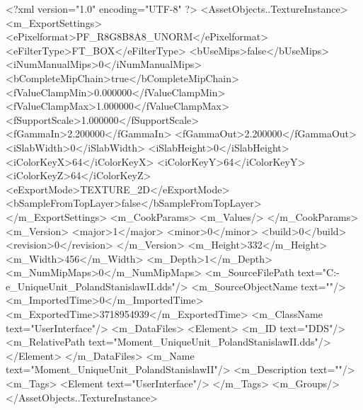 <?xml version="1.0" encoding="UTF-8" ?>
<AssetObjects..TextureInstance>
	<m_ExportSettings>
		<ePixelformat>PF_R8G8B8A8_UNORM</ePixelformat>
		<eFilterType>FT_BOX</eFilterType>
		<bUseMips>false</bUseMips>
		<iNumManualMips>0</iNumManualMips>
		<bCompleteMipChain>true</bCompleteMipChain>
		<fValueClampMin>0.000000</fValueClampMin>
		<fValueClampMax>1.000000</fValueClampMax>
		<fSupportScale>1.000000</fSupportScale>
		<fGammaIn>2.200000</fGammaIn>
		<fGammaOut>2.200000</fGammaOut>
		<iSlabWidth>0</iSlabWidth>
		<iSlabHeight>0</iSlabHeight>
		<iColorKeyX>64</iColorKeyX>
		<iColorKeyY>64</iColorKeyY>
		<iColorKeyZ>64</iColorKeyZ>
		<eExportMode>TEXTURE_2D</eExportMode>
		<bSampleFromTopLayer>false</bSampleFromTopLayer>
	</m_ExportSettings>
	<m_CookParams>
		<m_Values/>
	</m_CookParams>
	<m_Version>
		<major>1</major>
		<minor>0</minor>
		<build>0</build>
		<revision>0</revision>
	</m_Version>
	<m_Height>332</m_Height>
	<m_Width>456</m_Width>
	<m_Depth>1</m_Depth>
	<m_NumMipMaps>0</m_NumMipMaps>
	<m_SourceFilePath text="C:\Users\Deo-e\Desktop\Moment_UniqueUnit_PolandStanislawII.dds"/>
	<m_SourceObjectName text=""/>
	<m_ImportedTime>0</m_ImportedTime>
	<m_ExportedTime>3718954939</m_ExportedTime>
	<m_ClassName text="UserInterface"/>
	<m_DataFiles>
		<Element>
			<m_ID text="DDS"/>
			<m_RelativePath text="Moment_UniqueUnit_PolandStanislawII.dds"/>
		</Element>
	</m_DataFiles>
	<m_Name text="Moment_UniqueUnit_PolandStanislawII"/>
	<m_Description text=""/>
	<m_Tags>
		<Element text="UserInterface"/>
	</m_Tags>
	<m_Groups/>
</AssetObjects..TextureInstance>

